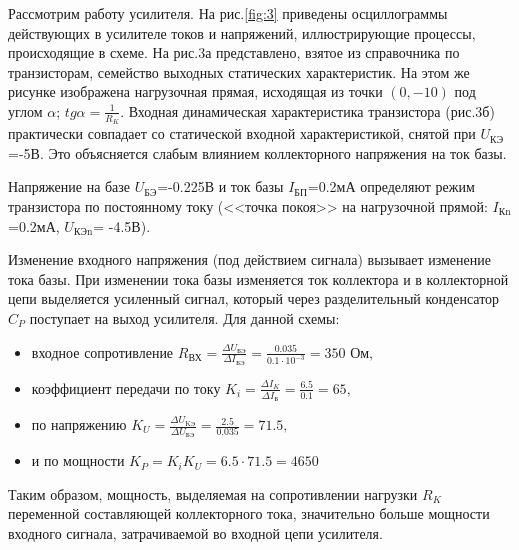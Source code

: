 Рассмотрим работу усилителя. На рис.\ref{fig:3} приведены осциллограммы действующих в усилителе токов и напряжений, иллюстрирующие процессы, происходящие в схеме. На рис.3а представлено, взятое из справочника по транзисторам, семейство выходных статических характеристик. На этом же рисунке изображена нагрузочная прямая, исходящая из точки $(0,-10)$ под углом $\alpha$; $tg\alpha = \frac{1}{R_K}$. Входная динамическая характеристика транзистора (рис.3б) практически совпадает со статической входной характеристикой, снятой при $U_{\text{КЭ}}$=-5В. Это объясняется слабым влиянием коллекторного напряжения на ток базы.

Напряжение на базе $U_{\text{БЭ}}$=-0.225В и ток базы $I_{\text{БП}}$=0.2мА
определяют режим транзистора по постоянному току (<<точка покоя>> на нагрузочной прямой: $I_{\text{Кn}}$=0.2мА, $U_{\text{КЭn}}$= -4.5В).

Изменение входного напряжения (под действием сигнала) вызывает изменение тока базы. При изменении тока базы изменяется ток коллектора и в коллекторной цепи выделяется
усиленный сигнал, который через разделительный конденсатор $C_P$ поступает на выход усилителя. Для данной схемы:
\begin{itemize}
\item входное сопротивление $R_{\text{ВХ}}=\frac{\Delta U_{\text{БЭ}}}{\Delta I_{\text{БЭ}}}=\frac{0.035}{0.1\cdot10^{-3}}=350 \text{ Ом},$

\item коэффициент передачи по току $K_i=\frac{\Delta I_K}{\Delta I_{\text{Б}}}=\frac{6.5}{0.1}=65,$

\item по напряжению $K_U=\frac{\Delta U_{\text{KЭ}}}{\Delta U_{\text{БЭ}}}=\frac{2.5}{0.035}=71.5,$

\item и по мощности $K_P=K_i K_U=6.5\cdot 71.5=4650$
\end{itemize}

Таким образом, мощность, выделяемая на сопротивлении нагрузки $R_K$ переменной составляющей коллекторного тока, значительно больше мощности входного сигнала, затрачиваемой во входной цепи усилителя.

